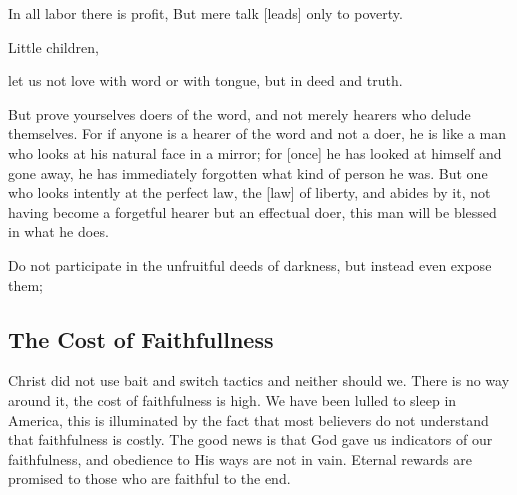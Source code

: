 \vspace{2\baselineskip}

\begin{scripture}[Proverbs 14:23]
    In all labor there is profit, But mere talk [leads] only to poverty.
\end{scripture}

\vspace{2\baselineskip}

\begin{scripture}[1 John 3:18]
    Little children, 

    let us not love with word or with tongue, but in deed and truth.
\end{scripture}

\vspace{2\baselineskip}

\begin{scripture}[James 1:22-25]
    But prove yourselves doers of the word, and not merely hearers who delude themselves.
    For if anyone is a hearer of the word and not a doer, he is like a man who looks at his natural face in a mirror;
    for [once] he has looked at himself and gone away, he has immediately forgotten what kind of person he was.
    But one who looks intently at the perfect law, the [law] of liberty, and abides by it, not having become a forgetful hearer but an effectual doer, this man will be blessed in what he does.
\end{scripture}

\vspace{2\baselineskip}

\begin{scripture}[Ephesians 5:11]
    Do not participate in the unfruitful deeds of darkness, but instead even expose them;
\end{scripture}

\vspace{2\baselineskip}


\pagebreak
\subsection{The Cost of Faithfullness}
\begin{fullwidth}

Christ did not use bait and switch tactics and neither should we. There is no way around it, the cost of faithfulness is high. We have been lulled to sleep in America, this is 
illuminated by the fact that most believers do not understand that faithfulness is costly. The good news is that God gave us indicators of our faithfulness, 
and obedience to His ways are not in vain. Eternal rewards are promised to those who are faithful to the end.
\end{fullwidth}

